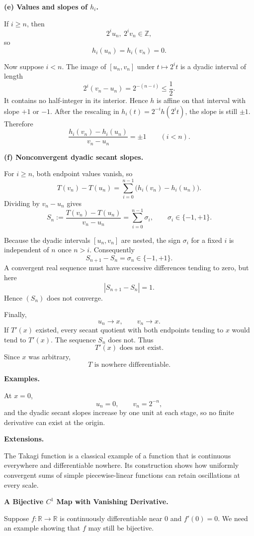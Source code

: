 \begin{solution}
\par\smallskip\noindent\textbf{(e) Values and slopes of \(h_i\).}

If \(i\ge n\), then
\[
2^iu_n,\ 2^iv_n\in\mathbb Z,
\]
so
\[
h_i(u_n)=h_i(v_n)=0.
\]

Now suppose \(i<n\). The image of \([u_n,v_n]\) under
\(t\mapsto2^it\) is a dyadic interval of length
\[
2^i(v_n-u_n)
=
2^{-(n-i)}
\le
\frac12.
\]
It contains no half-integer in its interior. Hence \(h\) is affine on
that interval with slope \(+1\) or \(-1\). After the rescaling in
\(h_i(t)=2^{-i}h(2^it)\), the slope is still \(\pm1\). Therefore
\[
\boxed{
\frac{h_i(v_n)-h_i(u_n)}{v_n-u_n}
=
\pm1
\qquad(i<n).}
\]

\par\smallskip\noindent\textbf{(f) Nonconvergent dyadic secant slopes.}

For \(i\ge n\), both endpoint values vanish, so
\[
T(v_n)-T(u_n)
=
\sum_{i=0}^{n-1}
\bigl(h_i(v_n)-h_i(u_n)\bigr).
\]
Dividing by \(v_n-u_n\) gives
\[
S_n
:=
\frac{T(v_n)-T(u_n)}{v_n-u_n}
=
\sum_{i=0}^{n-1}\sigma_i,
\qquad
\sigma_i\in\{-1,+1\}.
\]

Because the dyadic intervals \([u_n,v_n]\) are nested, the sign
\(\sigma_i\) for a fixed \(i\) is independent of \(n\) once \(n>i\).
Consequently
\[
S_{n+1}-S_n
=
\sigma_n
\in\{-1,+1\}.
\]
A convergent real sequence must have successive differences tending to
zero, but here
\[
|S_{n+1}-S_n|=1.
\]
Hence \((S_n)\) does not converge.

Finally,
\[
u_n\to x,
\qquad
v_n\to x.
\]
If \(T'(x)\) existed, every secant quotient with both endpoints tending
to \(x\) would tend to \(T'(x)\). The sequence \(S_n\) does not. Thus
\[
\boxed{T'(x)\text{ does not exist}.}
\]
Since \(x\) was arbitrary,
\[
\boxed{T\text{ is nowhere differentiable}.}
\]

\medskip
\noindent\textbf{Examples.}

At \(x=0\),
\[
u_n=0,
\qquad
v_n=2^{-n},
\]
and the dyadic secant slopes increase by one unit at each stage, so no
finite derivative can exist at the origin.

\medskip
\noindent\textbf{Extensions.}

The Takagi function is a classical example of a function that is
continuous everywhere and differentiable nowhere. Its construction
shows how uniformly convergent sums of simple piecewise-linear functions
can retain oscillations at every scale.
\end{solution}

\begin{problem}[CP-II-0459]
\label{prob:cp-ii-0459}
\textbf{A Bijective \(C^1\) Map with Vanishing Derivative.}

\hspace*{1.5em}Suppose $f:\mathbb{R}\to\mathbb{R}$ is continuously differentiable near $0$ and $f'(0)=0$.
	We need an example showing that $f$ may still be bijective.
\end{problem}

